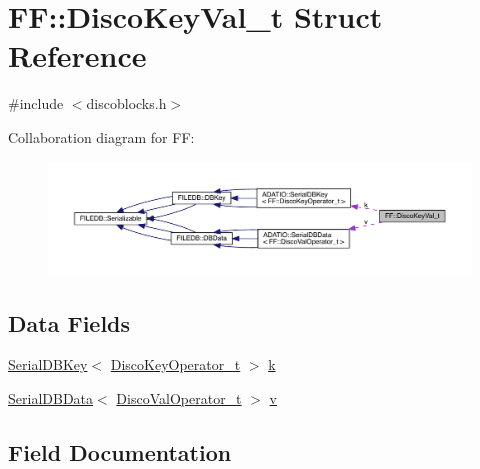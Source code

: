 \hypertarget{structFF_1_1DiscoKeyVal__t}{}\section{FF\+:\+:Disco\+Key\+Val\+\_\+t Struct Reference}
\label{structFF_1_1DiscoKeyVal__t}


{\ttfamily \#include $<$discoblocks.\+h$>$}



Collaboration diagram for FF\+:
\nopagebreak
\begin{figure}[H]
\begin{center}
\leavevmode
\includegraphics[width=350pt]{d3/ded/structFF_1_1DiscoKeyVal__t__coll__graph}
\end{center}
\end{figure}
\subsection*{Data Fields}
\begin{DoxyCompactItemize}
\item 
\mbox{\hyperlink{classADATIO_1_1SerialDBKey}{Serial\+D\+B\+Key}}$<$ \mbox{\hyperlink{structFF_1_1DiscoKeyOperator__t}{Disco\+Key\+Operator\+\_\+t}} $>$ \mbox{\hyperlink{structFF_1_1DiscoKeyVal__t_ae885692987726bc675c54c905d3ac948}{k}}
\item 
\mbox{\hyperlink{classADATIO_1_1SerialDBData}{Serial\+D\+B\+Data}}$<$ \mbox{\hyperlink{classFF_1_1DiscoValOperator__t}{Disco\+Val\+Operator\+\_\+t}} $>$ \mbox{\hyperlink{structFF_1_1DiscoKeyVal__t_ae0d9c7724d26fd2b0c5118b65651b443}{v}}
\end{DoxyCompactItemize}


\subsection{Field Documentation}
\mbox{\label{structFF_1_1DiscoKeyVal__t_ae885692987726bc675c54c905d3ac948}} 
